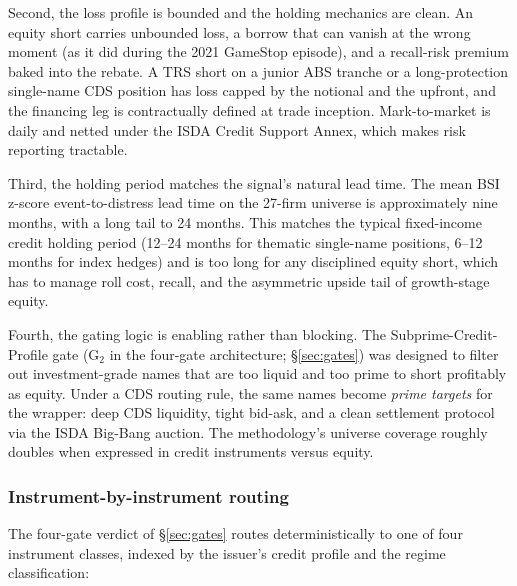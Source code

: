 \documentclass[11pt,a4paper]{article}
\begin{document}
Second, the loss profile is bounded and the holding mechanics are clean. An equity short carries unbounded loss, a borrow that can vanish at the wrong moment (as it did during the 2021 GameStop episode), and a recall-risk premium baked into the rebate. A TRS short on a junior ABS tranche or a long-protection single-name CDS position has loss capped by the notional and the upfront, and the financing leg is contractually defined at trade inception. Mark-to-market is daily and netted under the ISDA Credit Support Annex, which makes risk reporting tractable.

Third, the holding period matches the signal's natural lead time. The mean BSI z-score event-to-distress lead time on the 27-firm universe is approximately nine months, with a long tail to 24 months. This matches the typical fixed-income credit holding period (12--24 months for thematic single-name positions, 6--12 months for index hedges) and is too long for any disciplined equity short, which has to manage roll cost, recall, and the asymmetric upside tail of growth-stage equity.

Fourth, the gating logic is enabling rather than blocking. The Subprime-Credit-Profile gate (G$_2$ in the four-gate architecture; §\ref{sec:gates}) was designed to filter out investment-grade names that are too liquid and too prime to short profitably as equity. Under a CDS routing rule, the same names become \emph{prime targets} for the wrapper: deep CDS liquidity, tight bid-ask, and a clean settlement protocol via the ISDA Big-Bang auction. The methodology's universe coverage roughly doubles when expressed in credit instruments versus equity.

\subsubsection{Instrument-by-instrument routing}

The four-gate verdict of §\ref{sec:gates} routes deterministically to one of four instrument classes, indexed by the issuer's credit profile and the regime classification:
\end{document}
